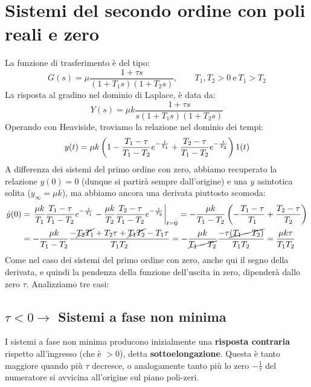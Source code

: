 \section{Sistemi del secondo ordine con poli reali e zero}
La funzione di trasferimento è del tipo:
\begin{equation}
G(s) = \mu \frac{1+\tau s}{(1+T_1s)(1+T_2s)}, \quad \quad T_1, T_2 > 0 \ \textrm{e} \ T_1 > T_2
\end{equation}
La risposta al gradino nel dominio di Laplace, è data da:
\begin{equation*}
Y(s) = \mu k  \frac{1+\tau s}{s(1+T_1s)(1+T_2s)}
\end{equation*}
Operando con Heaviside, troviamo la relazione nel dominio dei tempi:
\begin{equation}
y(t) = \mu k \left( 1-\frac{T_1-\tau}{T_1 -T_2}e^{-\frac{t}{T_1}} + \frac{T_2 - \tau}{T_1 - T_2}e^{-\frac{t}{T_2}} \right)1(t)
\end{equation}
A differenza dei sistemi del primo ordine con zero, abbiamo recuperato la relazione $y(0) = 0$ (dunque si partirà sempre dall'origine) e una $y$ asintotica solita ($y_\infty = \mu k$), ma abbiamo ancora una derivata piuttosto scomoda:
\begin{align*}
\dot y(0) & = \eval{\frac{\mu k}{T_1} \frac{T_1-\tau}{T_1 -T_2}e^{-\frac{t}{T_1}} - \frac{\mu k}{T_2}\frac{T_2 - \tau}{T_1 - T_2}e^{-\frac{t}{T_2}}}_{t = 0} = -\frac{\mu k }{T_1-T_2} \paren{-\frac{T_1 - \tau}{T_1}+\frac{T_2 -\tau}{T_2}} \\ & = -\frac{\mu k }{T_1-T_2} \frac{-\cancel{T_2T_1} + T_2\tau+\cancel{T_1T_2} -T_1\tau}{T_1T_2} = -\frac{\mu k }{\cancel{T_1-T_2}} \frac{-\tau\cancel{(T_1-T_2)}}{T_1T_2} = \frac{\mu k \tau}{T_1T_2}
\end{align*}
Come nel caso dei sistemi del primo ordine con zero, anche qui il segno della derivata, e quindi la pendenza della funzione dell'uscita in zero, dipenderà dallo zero $\tau$. Analizziamo tre casi:
\subsection{$\tau < 0 \rightarrow$ Sistemi a fase non minima}
I sistemi a fase non minima producono inizialmente una \textbf{risposta contraria} rispetto all'ingresso (che è $> 0$), detta \textbf{sottoelongazione}. Questa è tanto maggiore quando più $\tau$ decresce, o analogamente tanto più lo zero $-\frac{1}{\tau}$ del numeratore si avvicina all'origine sul piano poli-zeri.
